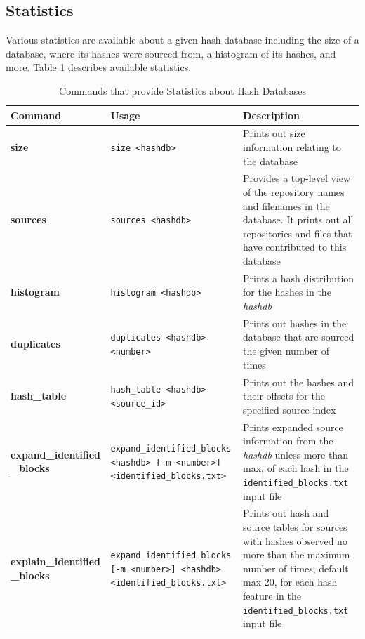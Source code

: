 \documentclass[11pt,fleqn]{article} %
\begin{document}
\subsection{Statistics}
Various statistics are available about a given hash database including the size of a database, where its hashes were sourced from, a histogram of its hashes, and more.
Table \ref{tab:statistics} describes available statistics.\\

\begin{table}[!ht]
\centering
\caption{Commands that provide Statistics about Hash Databases}
\label{tab:statistics}
\begin{tabular}{|p{3.5 cm}|p{6 cm}|p{4 cm}|}
\hline \hline
\textbf{Command} & \textbf{Usage} & \textbf{Description} \\
\hline
\textbf{size} & \verb+size <hashdb>+ & Prints out size information relating to the database\\
\hline
\textbf{sources} & \verb+sources <hashdb>+ & Provides a top-level view of the repository names and filenames in the database. It prints out all repositories and files that have contributed to this database\\
\hline
\textbf{histogram} & \verb+histogram <hashdb>+ &  Prints a hash distribution for the hashes in the \textit{hashdb}\\
\hline
\textbf{duplicates} & \verb+duplicates <hashdb> <number>+ &  Prints out hashes in the database that are sourced the given number of times\\
\hline
\textbf{hash\_table} & \verb+hash_table <hashdb>+ \verb+<source_id>+ &  Prints out the hashes and their offsets for the specified source index\\
\hline
\textbf{expand\_identified} \textbf{\_blocks} & \verb+expand_identified_blocks+ \verb+<hashdb> [-m <number>]+ \verb+<identified_blocks.txt>+ & Prints expanded source information from the \textit{hashdb} unless more than max, of each hash in the \texttt{identified\_blocks.txt} input file\\
\hline
\textbf{explain\_identified} \textbf{\_blocks} & \verb+expand_identified_blocks+ \verb+[-m <number>] <hashdb>+ \verb+<identified_blocks.txt>+ & Prints out hash and source tables for sources with hashes observed no more than the maximum number of times, default max 20, for each hash feature in the \texttt{identified\_blocks.txt} input file\\
\hline
\end{tabular}
\end{table}
\end{document}
